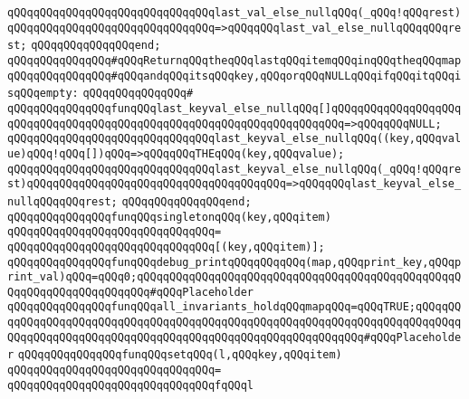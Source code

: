 \verb|qQQqqQQqqQQqqQQqqQQqqQQqqQQqqQQqlast_val_else_nullqQQq(_qQQq!qQQqrest)qQQqqQQqqQQqqQQqqQQqqQQqqQQqqQQq=>qQQqqQQqlast_val_else_nullqQQqqQQqrest;|\newline
\verb|qQQqqQQqqQQqqQQqend;|\newline
\newline
\verb|qQQqqQQqqQQqqQQq#qQQqReturnqQQqtheqQQqlastqQQqitemqQQqinqQQqtheqQQqmap|\newline
\verb|qQQqqQQqqQQqqQQq#qQQqandqQQqitsqQQqkey,qQQqorqQQqNULLqQQqifqQQqitqQQqisqQQqempty:|\newline
\verb|qQQqqQQqqQQqqQQq#|\newline
\verb|qQQqqQQqqQQqqQQqfunqQQqlast_keyval_else_nullqQQq[]qQQqqQQqqQQqqQQqqQQqqQQqqQQqqQQqqQQqqQQqqQQqqQQqqQQqqQQqqQQqqQQqqQQqqQQq=>qQQqqQQqNULL;|\newline
\verb|qQQqqQQqqQQqqQQqqQQqqQQqqQQqqQQqlast_keyval_else_nullqQQq((key,qQQqvalue)qQQq!qQQq[])qQQq=>qQQqqQQqTHEqQQq(key,qQQqvalue);|\newline
\verb|qQQqqQQqqQQqqQQqqQQqqQQqqQQqqQQqlast_keyval_else_nullqQQq(_qQQq!qQQqrest)qQQqqQQqqQQqqQQqqQQqqQQqqQQqqQQqqQQqqQQq=>qQQqqQQqlast_keyval_else_nullqQQqqQQqrest;|\newline
\verb|qQQqqQQqqQQqqQQqend;|\newline
\newline
\newline
\verb|qQQqqQQqqQQqqQQqfunqQQqsingletonqQQq(key,qQQqitem)|\newline
\verb|qQQqqQQqqQQqqQQqqQQqqQQqqQQqqQQq=|\newline
\verb|qQQqqQQqqQQqqQQqqQQqqQQqqQQqqQQq[(key,qQQqitem)];|\newline
\newline
\verb|qQQqqQQqqQQqqQQqfunqQQqdebug_printqQQqqQQqqQQq(map,qQQqprint_key,qQQqprint_val)qQQq=qQQq0;qQQqqQQqqQQqqQQqqQQqqQQqqQQqqQQqqQQqqQQqqQQqqQQqqQQqqQQqqQQqqQQqqQQqqQQq#qQQqPlaceholder|\newline
\verb|qQQqqQQqqQQqqQQqfunqQQqall_invariants_holdqQQqmapqQQq=qQQqTRUE;qQQqqQQqqQQqqQQqqQQqqQQqqQQqqQQqqQQqqQQqqQQqqQQqqQQqqQQqqQQqqQQqqQQqqQQqqQQqqQQqqQQqqQQqqQQqqQQqqQQqqQQqqQQqqQQqqQQqqQQqqQQqqQQqqQQq#qQQqPlaceholder|\newline
\newline
\verb|qQQqqQQqqQQqqQQqfunqQQqsetqQQq(l,qQQqkey,qQQqitem)|\newline
\verb|qQQqqQQqqQQqqQQqqQQqqQQqqQQqqQQq=|\newline
\verb|qQQqqQQqqQQqqQQqqQQqqQQqqQQqqQQqfqQQql|\newline
